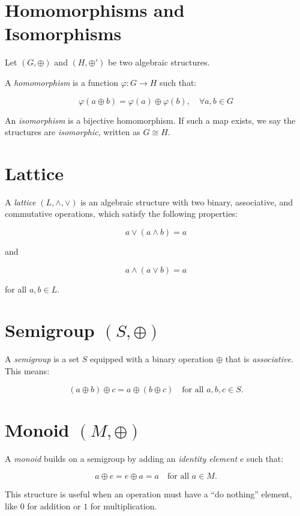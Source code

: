 \section{Homomorphisms and Isomorphisms}

Let \((G, \oplus)\) and \((H, \oplus')\) be two algebraic structures.

A \emph{homomorphism} is a function \(\varphi: G \to H\) such that:
    
\[
  \varphi(a \oplus b) = \varphi(a) \oplus \varphi(b), \quad \forall a,b \in G
\]
    
An \emph{isomorphism} is a bijective homomorphism. If such a map exists, we say the structures are \emph{isomorphic}, 
written as \(G \cong H\).

\section{Lattice}

A \emph{lattice} \((L, \land, \lor)\) is an algebraic structure with two binary, associative, and commutative operations, which satisfy 
the following properties:

\[
    a \lor (a \land b) = a
\]

and 

\[
    a \land (a \lor b) = a
\]

for all \(a,b \in L\).
 
\section{Semigroup \texorpdfstring{\((S, \oplus)\)}{}}

A \emph{semigroup} is a set \(S\) equipped with a binary operation \(\oplus\) that is \emph{associative}. This means:

\[
    (a \oplus b) \oplus c = a \oplus (b \oplus c) \quad \text{for all } a, b, c \in S.
\]

\section{Monoid \texorpdfstring{\((M, \oplus)\)}{}}

A \emph{monoid} builds on a semigroup by adding an \emph{identity element} \(e\) such that:

\[
    a \oplus e = e \oplus a = a \quad \text{for all } a \in M.
\]

This structure is useful when an operation must have a ``do nothing'' element, like \(0\) for addition or \(1\) for multiplication.

